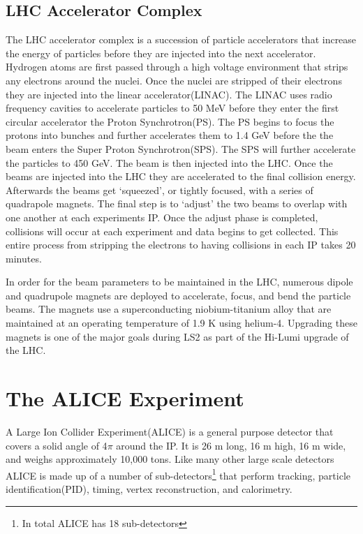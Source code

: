 \subsection{LHC Accelerator Complex}\label{sec:LHCop}
The LHC accelerator complex is a succession of particle accelerators that increase the energy of particles before they are injected into the next accelerator.  Hydrogen atoms are first passed through a high voltage environment that strips any electrons around the nuclei.  Once the nuclei are stripped of their electrons they are injected into the linear accelerator(LINAC).  The LINAC uses radio frequency cavities to accelerate particles to 50 MeV before they enter the first circular accelerator the Proton Synchrotron(PS).  The PS begins to focus the protons into bunches and further accelerates them to 1.4 GeV before the the beam enters the Super Proton Synchrotron(SPS).  The SPS will further accelerate the particles to 450 GeV.  The beam is then injected into the LHC.  Once the beams are injected into the LHC they are accelerated to the final collision energy.  Afterwards the beams get `squeezed', or tightly focused, with a series of quadrapole magnets.  The final step is to `adjust'  the two beams to overlap with one another at each experiments IP.  Once the adjust phase is completed, collisions will occur at each experiment and data begins to get collected.  This entire process from stripping the electrons to having collisions in each IP takes 20 minutes.

In order for the beam parameters to be maintained in the LHC, numerous dipole and quadrupole magnets are deployed to accelerate, focus, and bend the particle beams.  The magnets use a superconducting niobium-titanium alloy that are maintained at an operating temperature of 1.9 K using helium-4.  Upgrading these magnets is one of the major goals during LS2 as part of the Hi-Lumi upgrade of the LHC\cite{Fabjan:2011jb}.


\section{The ALICE Experiment}
A Large Ion Collider Experiment(ALICE) is a general purpose detector that covers a solid angle of 4$ \pi$ around the IP.  It is 26 m long, 16 m high, 16 m wide, and weighs approximately 10,000 tons\cite{Fabjan:2011jb}.  Like many other large scale detectors ALICE is made up of a number of sub-detectors\footnote{In total ALICE has 18 sub-detectors} that perform tracking, particle identification(PID), timing, vertex reconstruction, and calorimetry.  

